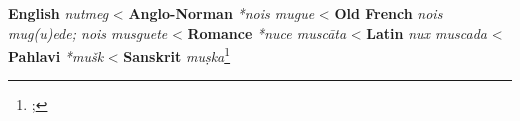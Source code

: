\begin{etymology}\label{ety:nutmeg}
\textbf{English} \textit{nutmeg}
< \textbf{Anglo-Norman} \textit{*nois mugue}
< \textbf{Old French} \textit{nois mug(u)ede; nois musguete}
< \textbf{Romance} \textit{*nuce muscāta}
< \textbf{Latin} \textit{nux muscada}
< \textbf{Pahlavi} \textit{*mušk}
< \textbf{Sanskrit} \textit{muṣka}\footnote{; }
\end{etymology}